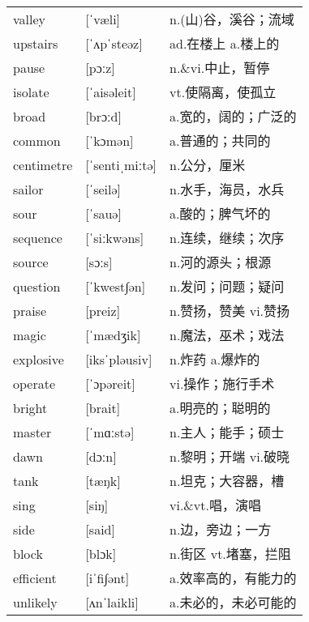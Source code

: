 \documentclass[a4paper]{article}
\begin{document}
\section{}
\begin{tabular}{l l l}

valley & [ˈvæli] & n.(山)谷，溪谷；流域 \\
upstairs & [ˈʌpˈsteəz] & ad.在楼上 a.楼上的 \\
pause & [pɔːz] & n.\&vi.中止，暂停 \\
isolate & [ˈaisəleit] & vt.使隔离，使孤立 \\
broad & [brɔːd] & a.宽的，阔的；广泛的 \\
common & [ˈkɔmən] & a.普通的；共同的 \\
centimetre & [ˈsentiˌmiːtə] & n.公分，厘米 \\
sailor & [ˈseilə] & n.水手，海员，水兵 \\
sour & [ˈsauə] & a.酸的；脾气坏的 \\
sequence & [ˈsiːkwəns] & n.连续，继续；次序 \\
source & [sɔːs] & n.河的源头；根源 \\
question & [ˈkwest∫ən] & n.发问；问题；疑问 \\
praise & [preiz] & n.赞扬，赞美 vi.赞扬 \\
magic & [ˈmædʒik] & n.魔法，巫术；戏法 \\
explosive & [iksˈpləusiv] & n.炸药 a.爆炸的 \\
operate & [ˈɔpəreit] & vi.操作；施行手术 \\
bright & [brait] & a.明亮的；聪明的 \\
master & [ˈmɑːstə] & n.主人；能手；硕士 \\
dawn & [dɔːn] & n.黎明；开端 vi.破晓 \\
tank & [tæŋk] & n.坦克；大容器，槽 \\
sing & [siŋ] & vi.\&vt.唱，演唱 \\
side & [said] & n.边，旁边；一方 \\
block & [blɔk] & n.街区 vt.堵塞，拦阻 \\
efficient & [iˈfi∫ənt] & a.效率高的，有能力的 \\
unlikely & [ʌnˈlaikli] & a.未必的，未必可能的 \\

\end{tabular}
\end{document}
